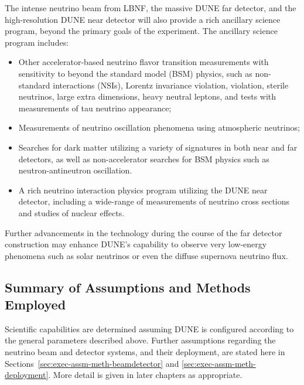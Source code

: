 The intense neutrino beam from LBNF, the massive DUNE \lartpc
far detector, and the high-resolution DUNE near detector will also
provide a rich ancillary science program, beyond the primary goals
of the experiment. The ancillary science program includes:
\begin{itemize}

\item Other accelerator-based neutrino flavor transition measurements with
      sensitivity to beyond the standard model (BSM) physics, such as non-standard
      interactions (NSIs), Lorentz invariance violation,  violation,
      sterile neutrinos, large extra dimensions, heavy neutral leptons,
      and tests with measurements of tau neutrino appearance;

     \item Measurements of neutrino oscillation phenomena using atmospheric neutrinos;


     \item Searches for dark matter utilizing a variety of
           signatures in both
           near and far detectors, as well as  
           non-accelerator searches for BSM physics 
           such as neutron-antineutron oscillation.

     \item A rich neutrino interaction physics program utilizing the DUNE near detector,
           including a wide-range of measurements of neutrino cross sections and studies of
           nuclear effects.

\end{itemize}

Further advancements in the \lartpc %
technology during the course of the far detector construction
may enhance DUNE's capability to observe very low-energy
phenomena such as solar neutrinos or even the diffuse
supernova neutrino flux.

\subsection{Summary of Assumptions and Methods Employed}
\label{sec:exec-assm-meth}

Scientific capabilities are determined assuming DUNE
is configured according to the general parameters described above.
Further assumptions regarding the neutrino beam and detector 
systems, and their deployment, are stated here in
Sections~\ref{sec:exec-assm-meth-beamdetector} and
\ref{sec:exec-assm-meth-deployment}.  More detail is given
in later chapters as appropriate.

